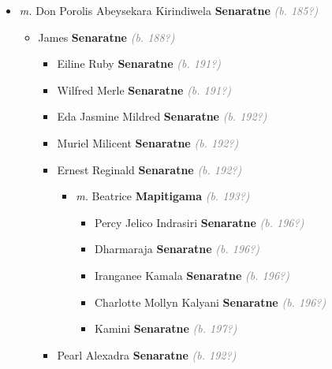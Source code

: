 \documentclass[10pt, openany]{book}
\begin{document}
\begin{itemize}
{\begin{itemize}
{\begin{itemize}
\item{\textit{m.} Don Porolis Abeysekara Kirindiwela \textbf{Senaratne} \textcolor{gray}{\textit{(b. 185?)}}   \label{couple:00000413:00000784} \begin{itemize}
\item{James \textbf{Senaratne} \textcolor{gray}{\textit{(b. 188?)}}
\begin{itemize}
\item{Eiline Ruby \textbf{Senaratne} \textcolor{gray}{\textit{(b. 191?)}}
  }
\item{Wilfred Merle \textbf{Senaratne} \textcolor{gray}{\textit{(b. 191?)}}
  }
\item{Eda Jasmine Mildred \textbf{Senaratne} \textcolor{gray}{\textit{(b. 192?)}}
   }
\item{Muriel Milicent \textbf{Senaratne} \textcolor{gray}{\textit{(b. 192?)}}
  }
\item{Ernest Reginald \textbf{Senaratne} \textcolor{gray}{\textit{(b. 192?)}}
\begin{itemize}
\item{\textit{m.} Beatrice \textbf{Mapitigama} \textcolor{gray}{\textit{(b. 193?)}}   \label{couple:00000527:00000790} \begin{itemize}
\item{Percy Jelico Indrasiri \textbf{Senaratne} \textcolor{gray}{\textit{(b. 196?)}}
   }
\item{Dharmaraja \textbf{Senaratne} \textcolor{gray}{\textit{(b. 196?)}}
 }
\item{Iranganee Kamala \textbf{Senaratne} \textcolor{gray}{\textit{(b. 196?)}}
  }
\item{Charlotte Mollyn Kalyani \textbf{Senaratne} \textcolor{gray}{\textit{(b. 196?)}}
   }
\item{Kamini \textbf{Senaratne} \textcolor{gray}{\textit{(b. 197?)}}
 }
\end{itemize}}
\end{itemize}
  }
\item{Pearl Alexadra \textbf{Senaratne} \textcolor{gray}{\textit{(b. 192?)}}
}
\end{itemize}}
\end{itemize}}
\end{itemize}}
\end{itemize}}
\end{itemize}
\end{document}
